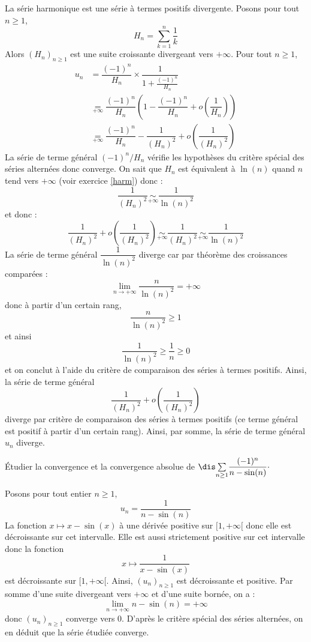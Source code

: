 \documentclass[a4paper,10pt]{report}
\newcommand{\Sum}[2]{\ensuremath{\textstyle{\sum\limits_{#1}^{#2}}}}
\begin{document}
\corr La série harmonique est une série à termes positifs divergente. Posons pour  tout $n \geq 1$,
$$ H_n = \sum_{k=1}^n \dfrac{1}{k}$$
Alors $(H_n)_{n \geq 1}$ est une suite croissante divergeant vers $+ \infty$. Pour tout $n \geq 1$,
\begin{align*}
u_n & = \dfrac{(-1)^n}{H_n} \times \dfrac{1}{1+ \frac{(-1)^n}{H_n}} \\
& \underset{+\infty}{=}  \dfrac{(-1)^n}{H_n} \left( 1 - \dfrac{(-1)^n}{H_n} + o \left( \dfrac{1}{H_n} \right) \right) \\
& \underset{+\infty}{=}  \dfrac{(-1)^n}{H_n}  -\dfrac{1}{(H_n)^2} + o \left( \dfrac{1}{(H_n)^2} \right) 
\end{align*}
La série de terme général $(-1)^n/H_n$ vérifie les hypothèses du critère spécial des séries alternées donc converge. On sait que $H_n$ est équivalent à $\ln(n)$ quand $n$ tend vers $+ \infty$ (voir exercice \ref{harm}) donc :
$$ \dfrac{1}{(H_n)^2} \underset{+ \infty}{\sim} \dfrac{1}{\ln(n)^2}$$
et donc :
$$ \dfrac{1}{(H_n)^2} + o \left( \dfrac{1}{(H_n)^2} \right)  \underset{+ \infty}{\sim}  \dfrac{1}{(H_n)^2} \underset{+ \infty}{\sim} \dfrac{1}{\ln(n)^2}$$
La série de terme général $\dfrac{1}{\ln(n)^2}$ diverge car par théorème des croissances comparées :
$$ \lim_{n \rightarrow + \infty} \dfrac{n}{\ln(n)^2} = + \infty$$
donc à partir d'un certain rang,
$$ \dfrac{n}{\ln(n)^2} \geq 1$$
et ainsi 
$$ \dfrac{1}{\ln(n)^2} \geq \dfrac{1}{n} \geq 0$$
et on conclut à l'aide du critère de comparaison des séries à termes positifs. Ainsi, la série de terme général 
$$\dfrac{1}{(H_n)^2} + o \left( \dfrac{1}{(H_n)^2} \right)$$
diverge par critère de comparaison des séries à termes positifs (ce terme général est positif à partir d'un certain rang). Ainsi, par somme, la série de terme général $u_n$ diverge.

\medskip

\begin{Exa} Étudier la convergence et la convergence absolue de $\dis \Sum{n \geq 1}{} \dfrac{(-1)^n}{n-\sin(n)}\cdot$
\end{Exa}

\corr Posons pour tout entier $n \geq 1$,
$$ u_n = \dfrac{1}{n-\sin(n)}$$
La fonction $x \mapsto x- \sin(x)$ à une dérivée positive sur $[1, + \infty[$ donc elle est décroissante sur cet intervalle. Elle est aussi strictement positive sur cet intervalle donc la fonction 
$$ x \mapsto \dfrac{1}{x-\sin(x)}$$
est décroissante sur $[1, + \infty[$. Ainsi, $(u_n)_{n \geq 1}$ est décroissante et positive. Par somme d'une suite divergeant vers $+ \infty$ et d'une suite bornée, on a :
$$ \lim_{n \rightarrow + \infty} n - \sin(n) = + \infty$$
donc $(u_n)_{n \geq 1}$ converge vers $0$. D'après le critère spécial des séries alternées, on en déduit que la série étudiée converge.
\end{document}
